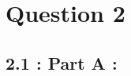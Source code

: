 \documentclass[12pt, a4paper]{article}
\begin{document}
\vspace*{-22pt}
\section*{Question 2}
\subsection*{2.1 : Part A : }
\end{document}
